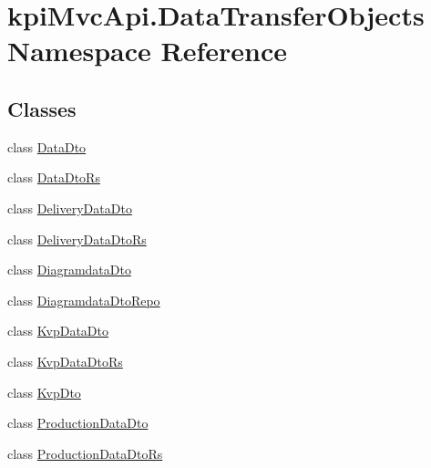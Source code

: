 \hypertarget{namespacekpi_mvc_api_1_1_data_transfer_objects}{}\section{kpi\+Mvc\+Api.\+Data\+Transfer\+Objects Namespace Reference}
\label{namespacekpi_mvc_api_1_1_data_transfer_objects}
\subsection*{Classes}
\begin{DoxyCompactItemize}
\item 
class \hyperlink{classkpi_mvc_api_1_1_data_transfer_objects_1_1_data_dto}{Data\+Dto}
\item 
class \hyperlink{classkpi_mvc_api_1_1_data_transfer_objects_1_1_data_dto_rs}{Data\+Dto\+Rs}
\item 
class \hyperlink{classkpi_mvc_api_1_1_data_transfer_objects_1_1_delivery_data_dto}{Delivery\+Data\+Dto}
\item 
class \hyperlink{classkpi_mvc_api_1_1_data_transfer_objects_1_1_delivery_data_dto_rs}{Delivery\+Data\+Dto\+Rs}
\item 
class \hyperlink{classkpi_mvc_api_1_1_data_transfer_objects_1_1_diagramdata_dto}{Diagramdata\+Dto}
\item 
class \hyperlink{classkpi_mvc_api_1_1_data_transfer_objects_1_1_diagramdata_dto_repo}{Diagramdata\+Dto\+Repo}
\item 
class \hyperlink{classkpi_mvc_api_1_1_data_transfer_objects_1_1_kvp_data_dto}{Kvp\+Data\+Dto}
\item 
class \hyperlink{classkpi_mvc_api_1_1_data_transfer_objects_1_1_kvp_data_dto_rs}{Kvp\+Data\+Dto\+Rs}
\item 
class \hyperlink{classkpi_mvc_api_1_1_data_transfer_objects_1_1_kvp_dto}{Kvp\+Dto}
\item 
class \hyperlink{classkpi_mvc_api_1_1_data_transfer_objects_1_1_production_data_dto}{Production\+Data\+Dto}
\item 
class \hyperlink{classkpi_mvc_api_1_1_data_transfer_objects_1_1_production_data_dto_rs}{Production\+Data\+Dto\+Rs}
\end{DoxyCompactItemize}
